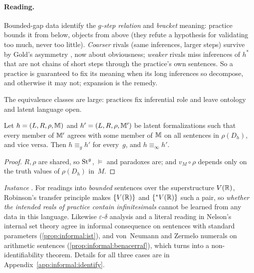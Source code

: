 \paragraph{Reading.}
Bounded-gap data identify the \emph{$g$-step relation} and \emph{bracket} meaning: practice bounds it from below, objects from above (they refute a hypothesis for validating too much, never too little). \emph{Coarser} rivals (same inferences, larger steps) survive by Gold's asymmetry \citep{gold1967language}, now about obviousness; \emph{weaker} rivals miss inferences of $h^*$ that are not chains of short steps through the practice's own sentences. So a practice is guaranteed to fix its meaning when its long inferences so decompose, and otherwise it may not; expansion is the remedy.

The equivalence classes are large: practices fix inferential role and leave ontology and latent language open.

\begin{proposition}\label{prop:informal:transfer}
Let $h=(L,R,\rho,\mathbb M)$ and $h'=(L,R,\rho,\mathbb M')$ be latent formalizations such that every member of $\mathbb M'$ agrees with some member of $\mathbb M$ on all sentences in $\rho(D_h)$, and vice versa. Then $h\equiv_gh'$ for every~$g$, and $h\equiv_\infty h'$.
\end{proposition}

\begin{proof}
$R,\rho$ are shared, so $\mathrm{St}^{g}_{}$, ${\models}$ and paradoxes are; and $v_M\circ\rho$ depends only on the truth values of $\rho(D_h)$ in~$M$.
\end{proof}

\emph{Instance} . For readings into \emph{bounded} sentences over the superstructure $V(\mathbb{R})$, Robinson's transfer principle \citep{robinson1966nonstandard} makes $\{V(\mathbb{R})\}$ and $\{{}^*V(\mathbb{R})\}$ such a pair, so \emph{whether the intended reals of practice contain infinitesimals} cannot be learned from any data in this language. Likewise $\varepsilon$-$\delta$ analysis and a literal reading in Nelson's internal set theory agree in informal consequence on sentences with standard parameters (\cref{prop:informal:ist}), and von~Neumann and Zermelo numerals on arithmetic sentences (\cref{prop:informal:benacerraf}), which turns \citet{benacerraf1965numbers} into a non-identifiability theorem. Details for all three cases are in Appendix~\ref{app:informal:identify}.

